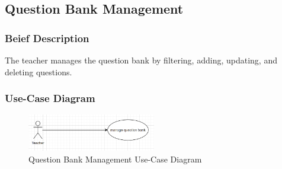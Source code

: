 \documentclass{article}
\begin{document}
\subsection{Question Bank Management}

\subsubsection{Beief Description}
The teacher manages the question bank by filtering, adding, updating, and deleting questions.
\subsubsection{Use-Case Diagram}
\begin{figure}[h]
    \centering
    \includegraphics[width=0.5\textwidth]{manage_question_bank.png}
    \caption{Question Bank Management Use-Case Diagram}
\end{figure}
\end{document}
